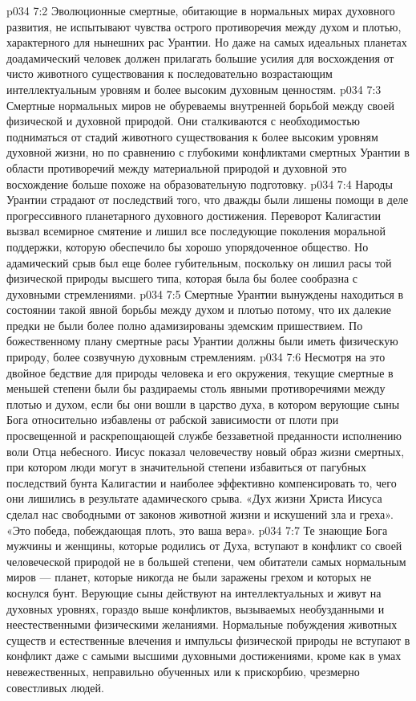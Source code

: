 \vs p034 7:2 Эволюционные смертные, обитающие в нормальных мирах духовного развития, не испытывают чувства острого противоречия между духом и плотью, характерного для нынешних рас Урантии. Но даже на самых идеальных планетах доадамический человек должен прилагать большие усилия для восхождения от чисто животного существования к последовательно возрастающим интеллектуальным уровням и более высоким духовным ценностям.
\vs p034 7:3 Смертные нормальных миров не обуреваемы внутренней борьбой между своей физической и духовной природой. Они сталкиваются с необходимостью подниматься от стадий животного существования к более высоким уровням духовной жизни, но по сравнению с глубокими конфликтами смертных Урантии в области противоречий между материальной природой и духовной это восхождение больше похоже на образовательную подготовку.
\vs p034 7:4 \pc Народы Урантии страдают от последствий того, что дважды были лишены помощи в деле прогрессивного планетарного духовного достижения. Переворот Калигастии вызвал всемирное смятение и лишил все последующие поколения моральной поддержки, которую обеспечило бы хорошо упорядоченное общество. Но адамический срыв был еще более губительным, поскольку он лишил расы той физической природы высшего типа, которая была бы более сообразна с духовными стремлениями.
\vs p034 7:5 Смертные Урантии вынуждены находиться в состоянии такой явной борьбы между духом и плотью потому, что их далекие предки не были более полно адамизированы эдемским пришествием. По божественному плану смертные расы Урантии должны были иметь физическую природу, более созвучную духовным стремлениям.
\vs p034 7:6 \pc Несмотря на это двойное бедствие для природы человека и его окружения, текущие смертные в меньшей степени были бы раздираемы столь явными противоречиями между плотью и духом, если бы они вошли в царство духа, в котором верующие сыны Бога относительно избавлены от рабской зависимости от плоти при просвещенной и раскрепощающей службе беззаветной преданности исполнению воли Отца небесного. Иисус показал человечеству новый образ жизни смертных, при котором люди могут в значительной степени избавиться от пагубных последствий бунта Калигастии и наиболее эффективно компенсировать то, чего они лишились в результате адамического срыва. «Дух жизни Христа Иисуса сделал нас свободными от законов животной жизни и искушений зла и греха». «Это победа, побеждающая плоть, это ваша вера».
\vs p034 7:7 Те знающие Бога мужчины и женщины, которые родились от Духа, вступают в конфликт со своей человеческой природой не в большей степени, чем обитатели самых нормальным миров --- планет, которые никогда не были заражены грехом и которых не коснулся бунт. Верующие сыны действуют на интеллектуальных и живут на духовных уровнях, гораздо выше конфликтов, вызываемых необузданными и неестественными физическими желаниями. Нормальные побуждения животных существ и естественные влечения и импульсы физической природы не вступают в конфликт даже с самыми высшими духовными достижениями, кроме как в умах невежественных, неправильно обученных или к прискорбию, чрезмерно совестливых людей.

